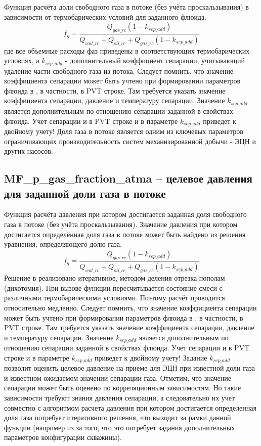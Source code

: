 Функция расчёта доли свободного газа в потоке (без учёта проскальзывания) в зависимости от термобарических условий для заданного флюида. 
$$f_g = \frac{Q_{gas\_rc} (1-k_{sep\_add})}{Q_{wat\_rc}+Q_{oil\_rc}+Q_{gas\_rc}(1-k_{sep\_add})} $$
где все объемные расходы фаз приведены в соответствующих термобарических условиях, а $k_{sep,add}$ - дополнительный коэффициент сепарации, учитывающий удаление части свободного газа из потока.
Следует помнить, что значение коэффициента сепарации может быть учтено при формировании параметров флюида в \unf{}, в частности, в PVT строке. Там требуется указать значение коэффициента сепарации, давление и температуру сепарации. Значение $k_{sep\_add}$ является дополнительным по отношению сепарации заданной в свойствах флюида. Учет сепарации и в PVT строке и в параметре $k_{sep\_add}$ приведет к двойному учету!
Доля газа в потоке является одним из ключевых параметров ограничивающих производительность систем механизированной добычи - ЭЦН и других насосов.


\subsection{MF\_p\_gas\_fraction\_atma – целевое давления для заданной доли газа в потоке}
Функция расчёта давления при котором достигается заданная доля свободного газа в потоке (без учёта проскальзывания). 
Значение давления при котором достигается определённая доля газа в потоке может быть найдено из решения уравнения, определяющего долю газа. 
$$f_g = \frac{Q_{gas\_rc} (1-k_{sep\_add})}{Q_{wat\_rc}+Q_{oil\_rc}+Q_{gas\_rc}(1-k_{sep\_add})} $$
Решение в \unf{} реализовано итеративное, методом деления отрезка пополам (дихотомия). При вызове функции пересчитывается состояние смеси с различными термобарическими условиями. Поэтому расчёт проводится относительно медленно. 
Следует помнить, что значение коэффициента сепарации может быть учтено при формировании параметров флюида в \unf{}, в частности, в PVT строке. Там требуется указать значение коэффициента сепарации, давление и температуру сепарации. Значение $k_{sep\_add}$ является дополнительным по отношению сепарации заданной в свойствах флюида. Учет сепарации и в PVT строке и в параметре $k_{sep\_add}$ приведет к двойному учету!
Задание $k_{sep\_add}$ позволит оценить целевое давление на приеме для ЭЦН при известной доли газа и известном ожидаемом значении сепарации газа. Отметим, что значение сепарации может быть оценено по корреляционным зависимостям. Но такие зависимости требуют знания давления сепарации, а следовательно их учет совместно с алгоритмом расчета давления при котором достигается определенная доля газа потребует итеративного решения, что выходит за рамки данной функции (например из за того, что это потребует задания дополнительных параметров конфигурации скважины).

